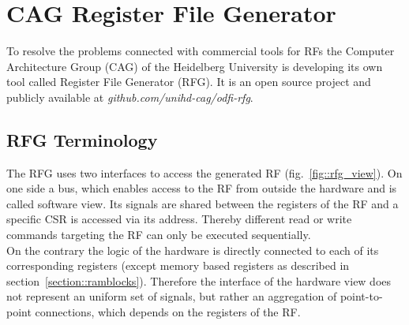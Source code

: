 \section{CAG Register File Generator}

To resolve the problems connected with commercial tools for RFs the Computer Architecture Group (CAG) of the Heidelberg University is developing its own tool called Register File Generator (RFG). It is an open source project and publicly available at \emph{github.com/unihd-cag/odfi-rfg}.

\subsection{RFG Terminology}\label{section::rfg_term}

The RFG uses two interfaces to access the generated RF (fig.~\ref{fig::rfg_view}). On one side a bus, which enables access to the RF from outside the hardware and is called software view. Its signals are shared between the registers of the RF and a specific CSR is accessed via its address. Thereby different read or write commands targeting the RF can only be executed sequentially.\\
On the contrary the logic of the hardware is directly connected to each of its corresponding registers (except memory based registers as described in section~\ref{section::ramblocks}). Therefore the interface of the hardware view does not represent an uniform set of signals, but rather an aggregation of point-to-point connections, which depends on the registers of the RF.

